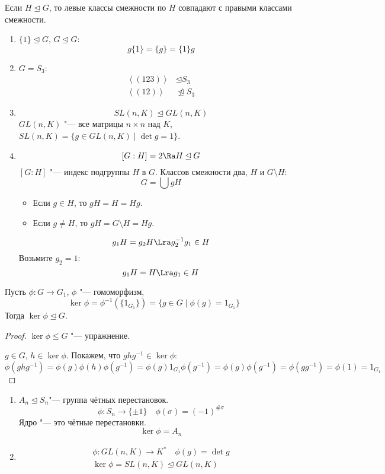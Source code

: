 \begin{conseq}
	Если $H \unlhd G$, то левые классы смежности по $H$ совпадают с правыми классами смежности.
\end{conseq}
\begin{exmp}\hfill\begin{enumerate}
\item
	$\{1\} \unlhd G$, $G \unlhd G$:
	\[ g\{1\} = \{g\} = \{1\}g \]

\item
	$G = S_3$:
	\begin{align*}
		\left<(123)\right> &\unlhd S_3 \\
		\left<(12)\right> &\ntrianglelefteq S_3
	\end{align*}

\item
	\[ SL(n, K) \unlhd GL(n, K) \]
	$GL(n, K)$ "--- все матрицы $n \times n$ над $K$,
	$SL(n, K) = \{g \in GL(n, K) \mid \det g = 1 \}$.

\item
	\[ [G:H] = 2 \Ra H \unlhd G \]
	$[G:H]$ "--- индекс подгруппы $H$ в $G$.
	Классов смежности два, $H$ и $G \setminus H$:
	\[ G = \bigcup gH \]
	\begin{itemize}
		\item Если $g \in H$, то $gH = H = Hg$.
		\item Если $g \ne H$, то $gH = G \setminus H = Hg$.
	\end{itemize}
	\[ g_1H = g_2H \Lra g_2^{-1}g_1 \in H \]
	Возьмите $g_2 = 1$:
	\[ g_1H = H \Lra g_1 \in H \]
\end{enumerate}\end{exmp}

\begin{theorem}
	Пусть $\phi\colon G \to G_1$, $\phi$ "--- гомоморфизм,
	\[ \ker \phi = \phi^{-1}(\{1_{G_1}\}) = \{g \in G \mid \phi(g) = 1_{G_1}\} \]
	Тогда $\ker \phi \unlhd G$.
\end{theorem}
\begin{proof}
	$\ker \phi \le G$ "--- упражнение.

	$g \in G$, $h \in \ker \phi$.
	Покажем, что $ghg^{-1} \in \ker \phi$:
	\[
		\phi(ghg^{-1}) = \phi(g)\phi(h)\phi(g^{-1}) = \phi(g)1_{G_1}\phi(g^{-1}) = \phi(g)\phi(g^{-1}) = \phi(gg^{-1}) = \phi(1) = 1_{G_1}
	\]
\end{proof}

\begin{exmp}\hfill\begin{enumerate}
\item
	$A_n \unlhd S_n$"--- группа чётных перестановок.
	\[ \phi\colon S_n \to \{\pm 1\} \quad \phi(\sigma) = (-1)^{\#\sigma} \]
	Ядро "--- это чётные перестановки.
	\[ \ker \phi = A_n \]

\item
	\begin{gather*}
		\phi\colon GL(n,K) \to K^* \quad \phi(g) = \det g \\
		\ker \phi = SL(n, K) \unlhd GL(n, K)
	\end{gather*}
\end{enumerate}\end{exmp}

